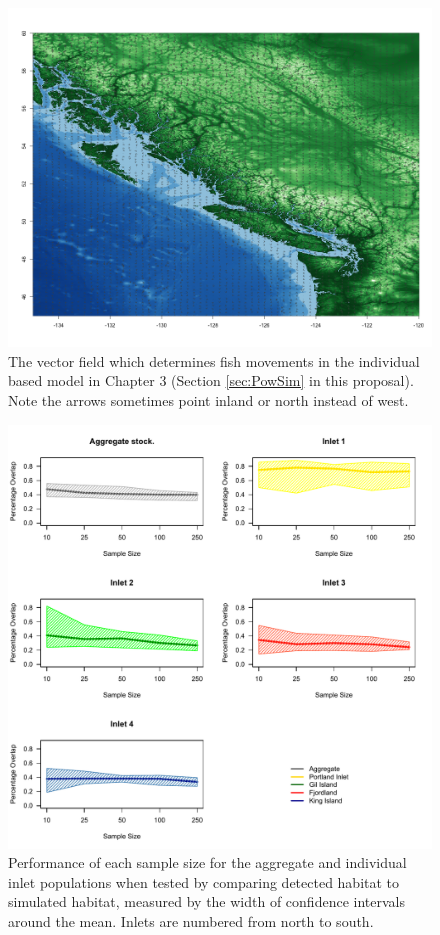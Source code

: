 \documentclass{article}
\begin{document}
\begin{figure}[!h]
\begin{center}
\includegraphics[scale = 0.4]{Images/vectorField.png}
\end{center}
\caption{The vector field which determines fish movements in the individual based model in Chapter 3 (Section \ref{sec:PowSim} in this proposal). Note the arrows sometimes point inland or north instead of west.} \label{fig:vectorField}
\end{figure}

\begin{figure}[!h]
\begin{center}
\includegraphics[scale = 0.8]{Images/overlap.pdf}
\end{center}
\caption{Performance of each sample size for the aggregate and individual inlet populations when tested by comparing detected habitat to simulated habitat, measured by the width of confidence intervals around the mean. Inlets are numbered from north to south.} \label{fig:overlap}
\end{figure}
\end{document}
